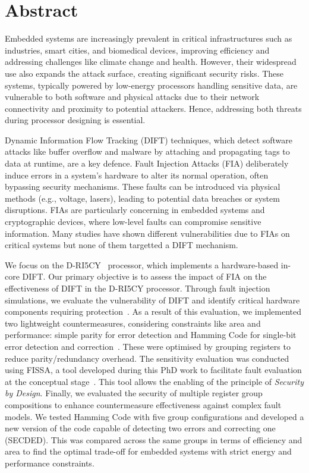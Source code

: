 \chapter*{Abstract}
\label{chapter:abstract}
\minitoc

Embedded systems are increasingly prevalent in critical infrastructures such as industries, smart cities, and biomedical devices, improving efficiency and addressing challenges like climate change and health. However, their widespread use also expands the attack surface, creating significant security risks. These systems, typically powered by low-energy processors handling sensitive data, are vulnerable to both software and physical attacks due to their network connectivity and proximity to potential attackers. Hence, addressing both threats during processor designing is essential.

Dynamic Information Flow Tracking (DIFT) techniques, which detect software attacks like buffer overflow and malware by attaching and propagating tags to data at runtime, are a key defence.
Fault Injection Attacks (FIA) deliberately induce errors in a system's hardware to alter its normal operation, often bypassing security mechanisms. These faults can be introduced via physical methods (e.g., voltage, lasers), leading to potential data breaches or system disruptions. FIAs are particularly concerning in embedded systems and cryptographic devices, where low-level faults can compromise sensitive information. Many studies have shown different vulnerabilities due to FIAs on critical systems but none of them targetted a DIFT mechanism.

We focus on the D-RI5CY~\cite{PDGLC-18-hpec} processor, which implements a hardware-based in-core DIFT. Our primary objective is to assess the impact of FIA on the effectiveness of DIFT in the D-RI5CY processor. Through fault injection simulations, we evaluate the vulnerability of DIFT and identify critical hardware components requiring protection~\cite{PLG-22-SensorsSP}. 
As a result of this evaluation, we implemented two lightweight countermeasures, considering constraints like area and performance: simple parity for error detection and Hamming Code for single-bit error detection and correction~\cite{PRLG-24-isvlsi}. These were optimised by grouping registers to reduce parity/redundancy overhead. The sensitivity evaluation was conducted using FISSA, a tool developed during this PhD work to facilitate fault evaluation at the conceptual stage~\cite{PLG-24-dsd}. This tool allows the enabling of the principle of \textit{Security by Design}.
Finally, we evaluated the security of multiple register group compositions to enhance countermeasure effectiveness against complex fault models. We tested Hamming Code with five group configurations and developed a new version of the code capable of detecting two errors and correcting one (SECDED). This was compared across the same groups in terms of efficiency and area to find the optimal trade-off for embedded systems with strict energy and performance constraints.